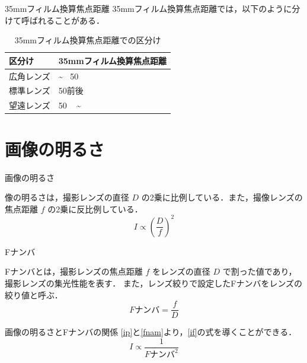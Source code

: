 \documentclass[8pt, jfont=ipaexm, t]{beamer} %
\begin{document}
\begin{frame}{35mmフィルム換算焦点距離}
  35mmフィルム換算焦点距離では，以下のように分けて呼ばれることがある．
  \begin{table}[H]
    \centering
    \caption{35mmフィルム換算焦点距離での区分け}
    \begin{tabular}{|l|l|}
      \hline
      区分け & 35mmフィルム換算焦点距離 \\
      \hline
      広角レンズ & \textasciitilde ~ 50 \\
      標準レンズ & 50前後 \\
      望遠レンズ & 50 ~ \textasciitilde \\
      \hline
    \end{tabular}
  \end{table}
\end{frame}


\section{画像の明るさ}
\begin{frame}{画像の明るさ}
\begin{block}{}
  像の明るさは，撮影レンズの直径 $D$ の2乗に比例している．また，撮像レンズの焦点距離 $f$ の2乗に反比例している．
  \begin{equation}\label{ip}
    I \propto (\dfrac{D}{f})^2
  \end{equation}
\end{block}
\end{frame}

\begin{frame}{Fナンバ}
  \begin{block}{}
    Fナンバとは，撮影レンズの焦点距離 $f$ をレンズの直径 $D$ で割った値であり，撮影レンズの集光性能を表す．
    また，レンズ絞りで設定したFナンバをレンズの絞り値と呼ぶ．
    \begin{equation} \label{fnam}
      F\text{ナンバ} = \dfrac{f}{D}
    \end{equation}
  \end{block}

  \begin{block}{画像の明るさとFナンバの関係}
    \eqref{ip}と\eqref{fnam}より，\eqref{if}の式を導くことができる．
    \begin{equation} \label{if}
      I \propto \dfrac{1}{F\text{ナンバ}^2}
    \end{equation}
  \end{block}
\end{frame}
\end{document}
